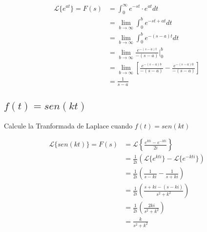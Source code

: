 \documentclass[12pt]{report}                                    %
\begin{document}
            \begin{equation*}   
            \begin{split}
                \mathscr{L}\{e^{at}\}
                    = F(s) & = \int_0^\infty e^{-st} \cdot e^{at} dt                                                 \\
                    & = \lim_{b \to \infty} \int_0^b e^{-st+at} dt                                                   \\
                    & = \lim_{b \to \infty} \int_0^b e^{-(s-a)t} dt                                                  \\
                    & = \lim_{b \to \infty} \frac{e^{-(s-a)t}}{-(s-a)} |_0^b                                         \\
                    & = \lim_{b \to \infty} \left[ \frac{e^{-(s-a)b}}{-(s-a)} -  \frac{e^{-(s-a)0}}{-(s-a)} \right]  \\
                    & = \frac{1}{s-a}
            \end{split}
            \end{equation*}


        \subsection{$f(t) = sen(kt)$}
            Calcule la Tranformada de Laplace cuando $f(t) = sen(kt)$

            \begin{equation*}   
            \begin{split}
                \mathscr{L}\{sen(kt)\}
                    = F(s) & = \mathscr{L}\left\{ \frac{e^{kti} - e^{-kti}}{2i} \right\}             \\
                    & = \frac{1}{2i} \left(\mathscr{L}\{e^{kti}\}-\mathscr{L}\{e^{-kti}\}\right)     \\
                    & = \frac{1}{2i} \left( \frac{1}{s-ki} - \frac{1}{s+ki} \right)                  \\
                    & = \frac{1}{2i} \left( \frac{s+ki -(s-ki)}{s^2+k^2} \right)                     \\
                    & = \frac{1}{2i} \left( \frac{2ki}{s^2+k^2} \right)                              \\
                    & = \frac{k}{s^2+k^2} \\
            \end{split}
            \end{equation*}
\end{document}
